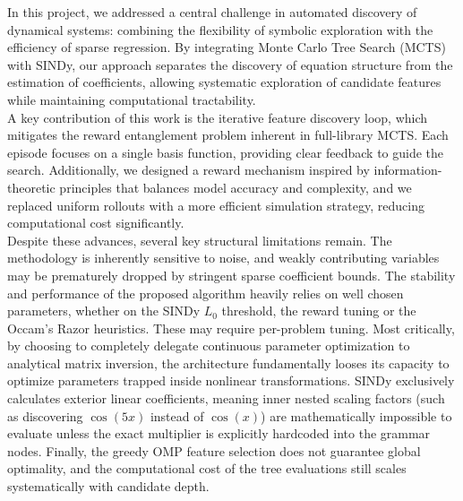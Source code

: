 \documentclass[11pt, a4paper]{article}
\begin{document}
In this project, we addressed a central challenge in automated discovery of dynamical systems: combining the flexibility of symbolic exploration with the efficiency of sparse regression. By integrating Monte Carlo Tree Search (MCTS) with SINDy, our approach separates the discovery of equation structure from the estimation of coefficients, allowing systematic exploration of candidate features while maintaining computational tractability.\\

A key contribution of this work is the iterative feature discovery loop, which mitigates the reward entanglement problem inherent in full-library MCTS. Each episode focuses on a single basis function, providing clear feedback to guide the search. Additionally, we designed a reward mechanism inspired by information-theoretic principles that balances model accuracy and complexity, and we replaced uniform rollouts with a more efficient simulation strategy, reducing computational cost significantly.\\

Despite these advances, several key structural limitations remain. The methodology is inherently sensitive to noise, and weakly contributing variables may be prematurely dropped by stringent sparse coefficient bounds. The stability and performance of the proposed algorithm heavily relies on well chosen parameters, whether on the SINDy $L_0$ threshold, the reward tuning or the Occam's Razor heuristics. These may require per-problem tuning. Most critically, by choosing to completely delegate continuous parameter optimization to analytical matrix inversion, the architecture fundamentally looses its capacity to optimize parameters trapped inside nonlinear transformations. SINDy exclusively calculates exterior linear coefficients, meaning inner nested scaling factors (such as discovering $\cos(5x)$ instead of $\cos(x)$) are mathematically impossible to evaluate unless the exact multiplier is explicitly hardcoded into the grammar nodes. Finally, the greedy OMP feature selection does not guarantee global optimality, and the computational cost of the tree evaluations still scales systematically with candidate depth.\\
\end{document}
